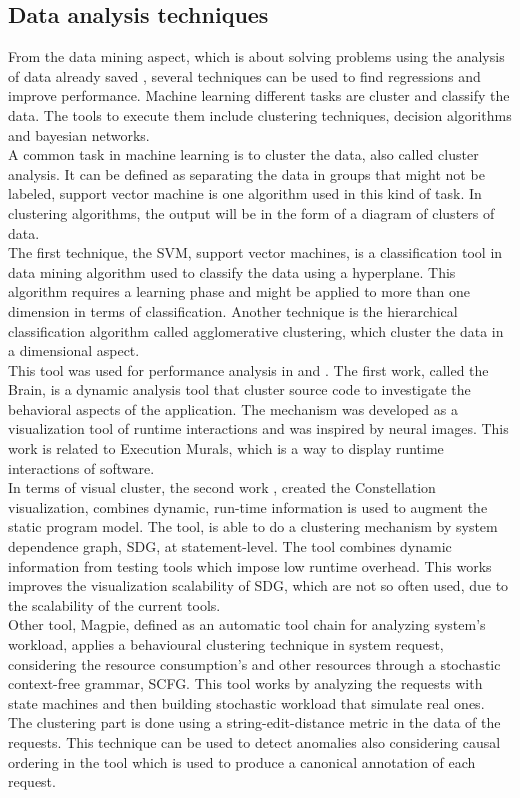 \subsection{Data analysis techniques}
From the data mining aspect, which is about solving problems using the analysis of data already saved \cite{data_mining_book}, several techniques can be used to find regressions and improve performance.  Machine learning different tasks are cluster and classify the data. The tools to execute them include clustering techniques, decision algorithms and bayesian networks.\\
A common task in machine learning is to cluster the data, also called cluster analysis. It can be defined as separating the data in groups that might not be labeled, support vector machine is one algorithm used in this kind of task. In clustering algorithms, the output will be in the form of a diagram of clusters of data.\\
The first technique, the SVM, support vector machines, is a classification tool in data mining algorithm used to classify the data using a hyperplane. This algorithm requires a learning phase and might be applied to more than one dimension in terms of classification. Another technique is the hierarchical classification algorithm called agglomerative clustering, which cluster the data in a dimensional aspect.\\
This tool was used for performance analysis in \cite{brain} and \cite{constellation}. The first work\cite{brain}, called the Brain, is a dynamic analysis tool that cluster source code to investigate the behavioral aspects of the application. The mechanism was developed as a visualization tool of runtime interactions and was inspired by neural images. This work is related to Execution Murals, which is a way to display runtime interactions of software.\\
In terms of visual cluster, the second work \cite{constellation}, created the Constellation visualization, combines dynamic, run-time information is used to augment the static program model. The tool, is able to do a clustering mechanism by system dependence graph, SDG, at statement-level. The tool combines dynamic information from testing tools which impose low runtime overhead. This works improves the visualization scalability of SDG, which are not so often used, due to the scalability of the current tools.\\
Other tool, Magpie\cite{magpie}, defined as an automatic tool chain for analyzing system’s workload, applies a behavioural clustering technique in system request, considering the resource consumption's and other resources through a stochastic context-free grammar, SCFG. This tool works by analyzing the requests with state machines and then building stochastic workload that simulate real ones. The clustering part is done using a string-edit-distance metric in the data of the requests. This technique can be used to detect anomalies also considering causal ordering in the tool which is used to produce a canonical annotation of each request.\\
